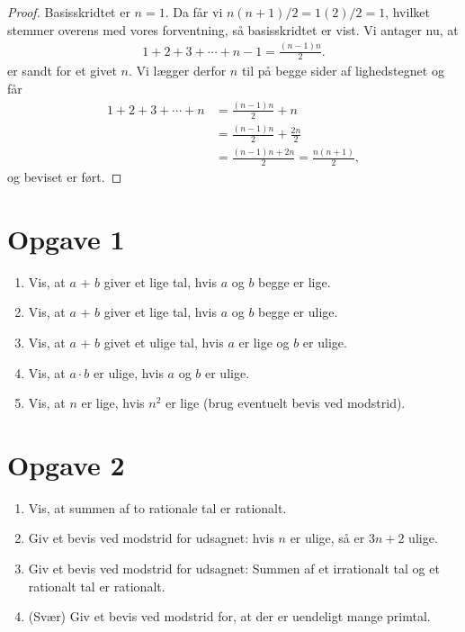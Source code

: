 \begin{proof}
Basisskridtet er $n = 1$. Da får vi $n(n+1)/2 = 1(2)/2 = 1$, hvilket stemmer overens med vores forventning, så basisskridtet er vist. 
Vi antager nu, at 
\begin{align*}
1+2+3+\cdots+n-1 = \frac{(n-1)n}{2}.
\end{align*}
er sandt for et givet $n$. Vi lægger derfor $n$ til på begge sider af lighedstegnet og får
\begin{align*}
1+2+3+\cdots + n &= \frac{(n-1)n}{2} +n \\ &= \frac{(n-1)n}{2} + \frac{2n}{2} \\&= \frac{(n-1)n+2n}{2}  = \frac{n(n+1)}{2},
\end{align*}
og beviset er ført.
\end{proof}

\section*{Opgave 1}
\begin{enumerate}[label=\roman*)]
\item Vis, at $a$ + $b$ giver et lige tal, hvis $a$ og $b$ begge er lige.
\item Vis, at $a$ + $b$ giver et lige tal, hvis $a$ og $b$ begge er ulige.
\item Vis, at $a$ + $b$ givet et ulige tal, hvis $a$ er lige og $b$ er ulige.
\item Vis, at $a\cdot b$ er ulige, hvis $a$ og $b$ er ulige.
\item Vis, at $n$ er lige, hvis $n^2$ er lige (brug eventuelt bevis ved modstrid).
\end{enumerate}
\section*{Opgave 2}
\begin{enumerate}[label=\roman*)]
\item Vis, at summen af to rationale tal er rationalt.
\item Giv et bevis ved modstrid for udsagnet: hvis $n$ er ulige, så er $3n+2$ ulige. 
\item Giv et bevis ved modstrid for udsagnet: Summen af et irrationalt tal og et rationalt tal er rationalt.
\item (Svær) Giv et bevis ved modstrid for, at der er uendeligt mange primtal. 
\end{enumerate}
